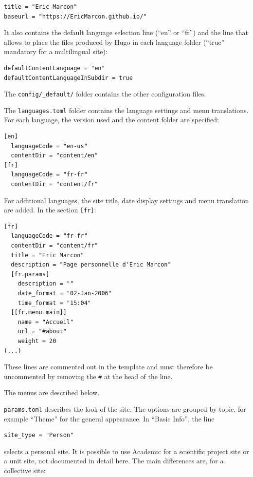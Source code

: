 \documentclass[
  12pt,
  american,
  a4paper,
  extrafontsizes,onecolumn,openright
  ]{memoir}
\begin{document}
\begin{verbatim}
title = "Eric Marcon"
baseurl = "https://EricMarcon.github.io/"
\end{verbatim}

It also contains the default language selection line (\enquote{en} or \enquote{fr}) and the line that allows to place the files produced by Hugo in each language folder (\enquote{true} mandatory for a multilingual site):

\begin{verbatim}
defaultContentLanguage = "en"
defaultContentLanguageInSubdir = true
\end{verbatim}

The \texttt{config/\_default/} folder contains the other configuration files.

The \texttt{languages.toml} folder contains the language settings and menu translations.
For each language, the version used and the content folder are specified:

\begin{verbatim}
[en]
  languageCode = "en-us"
  contentDir = "content/en"
[fr]
  languageCode = "fr-fr"
  contentDir = "content/fr"
\end{verbatim}

For additional languages, the site title, date display settings and menu translation are added.
In the section \texttt{{[}fr{]}}:

\begin{verbatim}
[fr]
  languageCode = "fr-fr"
  contentDir = "content/fr"
  title = "Eric Marcon"
  description = "Page personnelle d'Eric Marcon"
  [fr.params]
    description = ""
    date_format = "02-Jan-2006"
    time_format = "15:04"
  [[fr.menu.main]]
    name = "Accueil"
    url = "#about"
    weight = 20
(...)
\end{verbatim}

These lines are commented out in the template and must therefore be uncommented by removing the \texttt{\#} at the head of the line.

The menus are described below.

\texttt{params.toml} describes the look of the site.
The options are grouped by topic, for example \enquote{Theme} for the general appearance.
In \enquote{Basic Info}, the line

\begin{verbatim}
site_type = "Person"
\end{verbatim}

selects a personal site.
It is possible to use Academic for a scientific project site or a unit site, not documented in detail here.
The main differences are, for a collective site:
\end{document}
